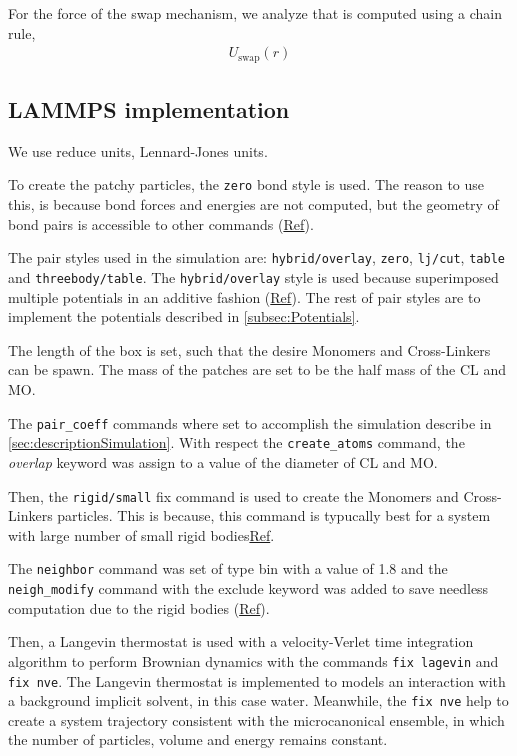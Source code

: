 \documentclass[../main.tex]{subfiles}
\begin{document}
For the force of the swap mechanism, we analyze that is computed using a chain rule,
\begin{align*}
    U_\mathrm{swap}(r)
\end{align*}


\subsection{LAMMPS implementation}

We use reduce units, Lennard-Jones units.

To create the patchy particles, the \verb|zero| bond style is used.
The reason to use this, is because bond forces and energies are not computed, but the geometry of bond pairs is accessible to other commands (\href{https://docs.lammps.org/bond_zero.html}{Ref}).

The pair styles used in the simulation are: \verb|hybrid/overlay|, \verb|zero|, \verb|lj/cut|, \verb|table| and \verb|threebody/table|.
The \verb|hybrid/overlay| style is used because superimposed multiple potentials in an additive fashion (\href{https://docs.lammps.org/pair_hybrid.html}{Ref}).
The rest of pair styles are to implement the potentials described in \ref{subsec:Potentials}.

The length of the box is set, such that the desire Monomers and Cross-Linkers can be spawn.
The mass of the patches are set to be the half mass of the CL and MO.

The \verb|pair_coeff| commands where set to accomplish the simulation describe in \ref{sec:descriptionSimulation}.
With respect the \verb|create_atoms| command, the \textit{overlap} keyword was assign to a value of the diameter of CL and MO.

Then, the \verb|rigid/small| fix command is used to create the Monomers and Cross-Linkers particles.
This is because, this command is typucally best for a system with large number of small rigid bodies\href{https://docs.lammps.org/fix_rigid.html}{Ref}.

The \verb|neighbor| command was set of type bin with a value of 1.8 and the \verb|neigh_modify| command with the exclude keyword was added to save needless computation due to the rigid bodies (\href{https://docs.lammps.org/neigh_modify.html}{Ref}).

Then, a Langevin thermostat is used with a velocity-Verlet time integration algorithm to perform Brownian dynamics with the commands \verb|fix lagevin| and \verb|fix nve|.
The Langevin thermostat is implemented to models an interaction with a background implicit solvent, in this case water.
Meanwhile, the \verb|fix nve| help to create a system trajectory consistent with the microcanonical ensemble, in which the number of particles, volume and energy remains constant.
\end{document}

